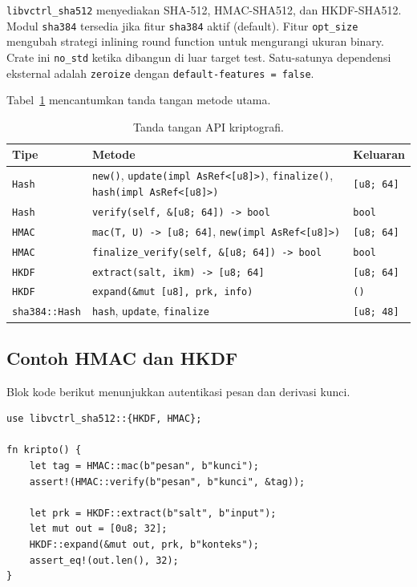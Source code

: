 \documentclass[11pt,a4paper]{article}
\begin{document}
\texttt{libvctrl\_sha512} menyediakan SHA-512, HMAC-SHA512, dan HKDF-SHA512. Modul \texttt{sha384} tersedia jika fitur \texttt{sha384} aktif (default). Fitur \texttt{opt\_size} mengubah strategi inlining round function untuk mengurangi ukuran binary. Crate ini \texttt{no\_std} ketika dibangun di luar target test. Satu-satunya dependensi eksternal adalah \texttt{zeroize} dengan \texttt{default-features = false}.

Tabel~\ref{tab:kripto} mencantumkan tanda tangan metode utama.

\begin{table}[H]
	\centering
	\caption{Tanda tangan API kriptografi.}
	\label{tab:kripto}
	\footnotesize
	\begin{tabularx}{\textwidth}{l X l}
		\toprule
		Tipe & Metode & Keluaran \\
		\midrule
		\texttt{Hash} & \texttt{new()}, \texttt{update(impl AsRef<[u8]>)}, \texttt{finalize()}, \texttt{hash(impl AsRef<[u8]>)} & \texttt{[u8; 64]} \\
		\texttt{Hash} & \texttt{verify(self, \&[u8; 64]) -> bool} & \texttt{bool} \\
		\texttt{HMAC} & \texttt{mac(T, U) -> [u8; 64]}, \texttt{new(impl AsRef<[u8]>)} & \texttt{[u8; 64]} \\
		\texttt{HMAC} & \texttt{finalize\_verify(self, \&[u8; 64]) -> bool} & \texttt{bool} \\
		\texttt{HKDF} & \texttt{extract(salt, ikm) -> [u8; 64]} & \texttt{[u8; 64]} \\
		\texttt{HKDF} & \texttt{expand(\&mut [u8], prk, info)} & \texttt{()} \\
		\texttt{sha384::Hash} & \texttt{hash}, \texttt{update}, \texttt{finalize} & \texttt{[u8; 48]} \\
		\bottomrule
	\end{tabularx}
\end{table}

\subsection{Contoh HMAC dan HKDF}

Blok kode berikut menunjukkan autentikasi pesan dan derivasi kunci.

\begin{lstlisting}[style=code]
use libvctrl_sha512::{HKDF, HMAC};

fn kripto() {
    let tag = HMAC::mac(b"pesan", b"kunci");
    assert!(HMAC::verify(b"pesan", b"kunci", &tag));

    let prk = HKDF::extract(b"salt", b"input");
    let mut out = [0u8; 32];
    HKDF::expand(&mut out, prk, b"konteks");
    assert_eq!(out.len(), 32);
}
\end{lstlisting}
\end{document}
